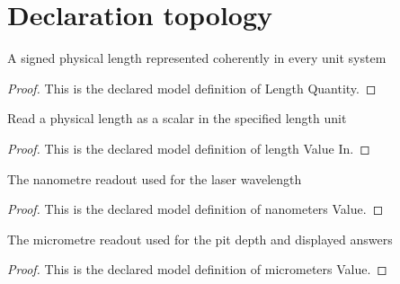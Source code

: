 \section{Declaration topology}
\begin{definition}
  \label{def:physics:phyx-mini-0116:phyxminiproblems-problemphyxmini0116-lengthquantity}
  A signed physical length represented coherently in every unit system
\end{definition}
\begin{proof}
  This is the declared model definition of Length Quantity.
\end{proof}
\begin{definition}
  \label{def:physics:phyx-mini-0116:phyxminiproblems-problemphyxmini0116-lengthvaluein}
  Read a physical length as a scalar in the specified length unit
\end{definition}
\begin{proof}
  This is the declared model definition of length Value In.
\end{proof}
\begin{definition}
  \label{def:physics:phyx-mini-0116:phyxminiproblems-problemphyxmini0116-nanometersvalue}
  The nanometre readout used for the laser wavelength
\end{definition}
\begin{proof}
  This is the declared model definition of nanometers Value.
\end{proof}
\begin{definition}
  \label{def:physics:phyx-mini-0116:phyxminiproblems-problemphyxmini0116-micrometersvalue}
  The micrometre readout used for the pit depth and displayed answers
\end{definition}
\begin{proof}
  This is the declared model definition of micrometers Value.
\end{proof}
